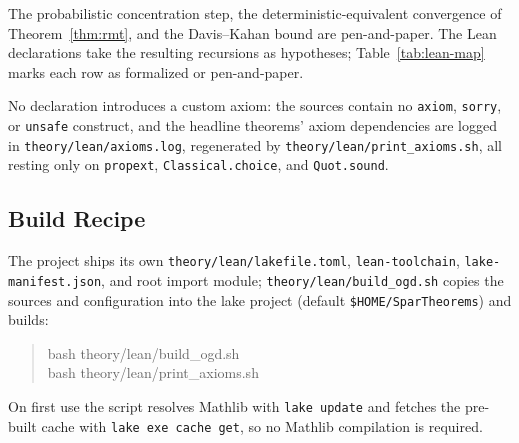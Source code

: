 The probabilistic concentration step, the deterministic-equivalent convergence of Theorem~\ref{thm:rmt}, and the Davis--Kahan bound are pen-and-paper.
The Lean declarations take the resulting recursions as hypotheses; Table~\ref{tab:lean-map} marks each row as formalized or pen-and-paper.

No declaration introduces a custom axiom: the sources contain no \texttt{axiom}, \texttt{sorry}, or \texttt{unsafe} construct, and the headline theorems' axiom dependencies are logged in \texttt{theory/lean/axioms.log}, regenerated by \texttt{theory/lean/print\_axioms.sh}, all resting only on \texttt{propext}, \texttt{Classical.choice}, and \texttt{Quot.sound}.

\subsection{Build Recipe}
{\sloppy The project ships its own \texttt{theory/lean/lakefile.toml}, \texttt{lean-toolchain}, \texttt{lake-manifest.json}, and root import module; \texttt{theory/lean/build\_ogd.sh} copies the sources and configuration into the lake project (default \texttt{\$HOME/SparTheorems}) and builds:\par}
\begin{quote}
\ttfamily
bash theory/lean/build\_ogd.sh\\
bash theory/lean/print\_axioms.sh
\end{quote}
On first use the script resolves Mathlib with \texttt{lake update} and fetches the pre-built cache with \texttt{lake exe cache get}, so no Mathlib compilation is required.


